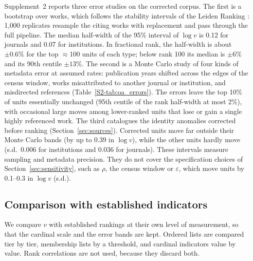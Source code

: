Supplement~2 reports three error studies on the corrected corpus. The first is a bootstrap over works, which follows the stability intervals of the Leiden Ranking \citep{waltmanLeidenRanking20112012}: 1,000 replicates resample the citing works with replacement and pass through the full pipeline. The median half-width of the 95\% interval of $\log v$ is 0.12 for journals and 0.07 for institutions. In fractional rank, the half-width is about $\pm0.6\%$ for the top $\approx$100 units of each type; below rank 100 its median is $\pm6\%$ and its 90th centile $\pm13\%$. The second is a Monte Carlo study of four kinds of metadata error at assumed rates: publication years shifted across the edges of the census window, works misattributed to another journal or institution, and misdirected references (Table~\ref{S2-tab:oa_errors}). The errors leave the top 10\% of units essentially unchanged (95th centile of the rank half-width at most 2\%), with occasional large moves among lower-ranked units that lose or gain a single highly referenced work. The third catalogues the identity anomalies corrected before ranking (Section~\ref{sec:sources}). Corrected units move far outside their Monte Carlo bands (by up to 0.39 in $\log v$), while the other units hardly move (s.d.\ 0.006 for institutions and 0.036 for journals). These intervals measure sampling and metadata precision. They do not cover the specification choices of Section~\ref{sec:sensitivity}, such as $\rho$, the census window or $\varepsilon$, which move units by 0.1--0.3 in $\log v$ (s.d.).

\subsection{Comparison with established indicators}
\label{sec:indicators}

We compare $v$ with established rankings at their own level of measurement, so that the cardinal scale and the error bands are kept. Ordered lists are compared tier by tier, membership lists by a threshold, and cardinal indicators value by value. Rank correlations are not used, because they discard both.

